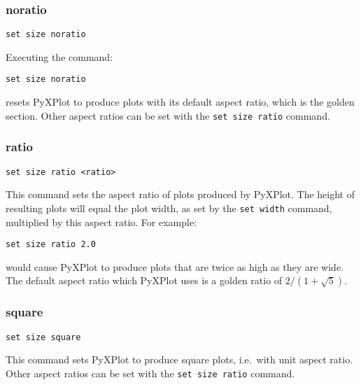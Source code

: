 \subsubsection{noratio}

\begin{verbatim}
set size noratio
\end{verbatim}

Executing the command:

\begin{verbatim}
set size noratio
\end{verbatim}

\noindent resets PyXPlot to produce plots with its default aspect ratio, which is the
golden section. Other aspect ratios can be set with the {\tt set size ratio}
command.


\subsubsection{ratio}

\begin{verbatim}
set size ratio <ratio>
\end{verbatim}

This command sets the aspect ratio of plots produced by PyXPlot.  The height of
resulting plots will equal the plot width, as set by the {\tt set width}
command, multiplied by this aspect ratio.  For example:

\begin{verbatim}
set size ratio 2.0
\end{verbatim}

\noindent would cause PyXPlot to produce plots that are twice as high as they
are wide.  The default aspect ratio which PyXPlot uses is a golden ratio of
$2/(1+\sqrt{5})$.


\subsubsection{square}

\begin{verbatim}
set size square
\end{verbatim}

This command sets PyXPlot to produce square plots, i.e.\ with unit aspect
ratio. Other aspect ratios can be set with the {\tt set size ratio} command.



